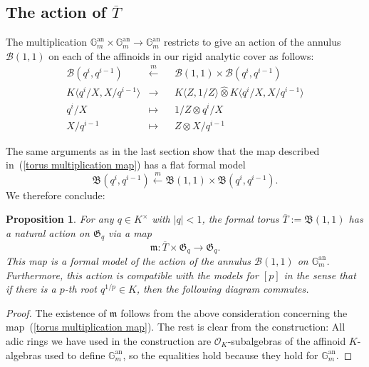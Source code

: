 \documentclass[10pt,oneside]{amsart}
\newtheorem{proposition}[theorem]{Proposition}
\theoremstyle{definition}
\begin{document}
	\subsection{The action of $\overline{T}$}
	The multiplication $\mathbb G_m^{\operatorname{an}}\times \mathbb G_m^{\operatorname{an}}\rightarrow \mathbb G_m^{\operatorname{an}}$ restricts to give an action of the annulus $\mathcal B(1,1)$ on each of the affinoids in our rigid analytic cover as follows: 
	\begin{equation}
	\begin{alignedat}{2} \label{torus multiplication map}
	\mathcal B(q^i,q^{i-1}) &\xleftarrow{m}&& \mathcal B(1,1)\times \mathcal B(q^i,q^{i-1})\\
	K\langle  q^i/X, X/q^{i-1} \rangle&\rightarrow &&K\langle Z, 1/Z\rangle\widehat{\otimes} K\langle  q^i/X, X/q^{i-1}\rangle\\
	q^i/X &\mapsto&& 1/Z\otimes q^i/X\\
	X/q^{i-1} &\mapsto&& Z\otimes X/q^{i-1}
	\end{alignedat}
	\end{equation}

	
	The same arguments as in the last section show that the map described in~(\ref{torus multiplication map}) has a flat formal model
	\[\mathfrak B(q^i,q^{i-1}) \xleftarrow{m} \mathfrak B(1,1)\times \mathfrak B(q^i,q^{i-1}).\] We therefore conclude:
	
	\begin{proposition}\label{action on formal model of torus}
		For any $q\in K^\times$ with $|q|<1$, the formal torus $\overline{T}:=\mathfrak B(1,1)$ has a natural action on $\mathfrak G_q$ via a map
		\[\mathfrak m:\overline{T}\times \mathfrak G_q\rightarrow \mathfrak G_q.\]
		This map is a formal model of the action of the annulus $\mathcal B(1,1)$ on $\mathbb G_m^{\operatorname{an}}$. Furthermore, this action is compatible with the models for $[p]$ in the sense that if there is a $p$-th root $q^{1/p}\in K$, then the following diagram commutes.
		\begin{center}
		\end{center}
	\end{proposition} 
	\begin{proof}
		The existence of $\mathfrak m$ follows from the above consideration concerning the map~(\ref{torus multiplication map}). The rest is clear from the construction: All adic rings we have used in the construction are $\mathcal O_K$-subalgebras of the affinoid $K$-algebras used to define $\mathbb G_m^{\operatorname{an}}$, so the equalities hold because they hold for $\mathbb G_m^{\operatorname{an}}$.
	\end{proof}
	
\end{document}
